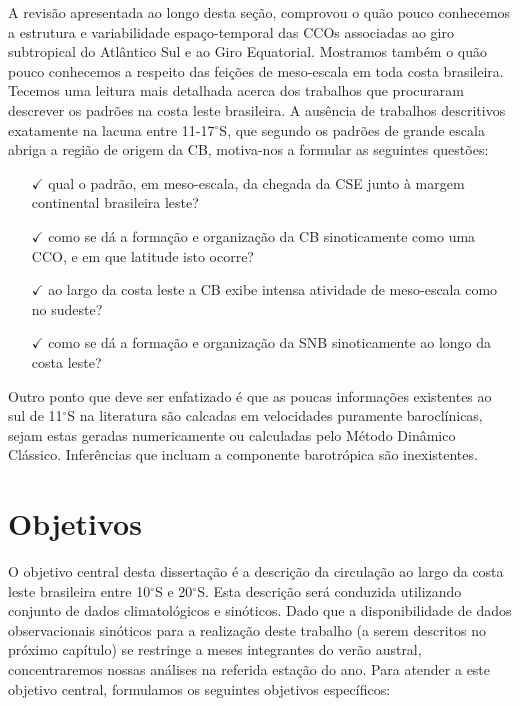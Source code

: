 A revisão apresentada ao longo desta seção, comprovou o quão pouco conhecemos a estrutura
e variabilidade espaço-temporal das CCOs associadas ao 
giro subtropical do Atlântico Sul e ao Giro Equatorial. Mostramos também o quão pouco conhecemos
a respeito das feições de meso-escala em toda costa brasileira. Tecemos uma leitura
mais detalhada acerca dos trabalhos que procuraram descrever os padrões na 
costa leste brasileira. A ausência de trabalhos descritivos exatamente
na lacuna entre 11-17$^\circ$S, que segundo os padrões de grande escala abriga  
a região de origem da CB, motiva-nos a formular as seguintes questões: 

\begin{itemize}

\item[$\checkmark$] qual o padrão, em meso-escala, da chegada da CSE junto à margem continental brasileira leste?

\item[$\checkmark$] como se dá a formação e organização da CB sinoticamente como uma CCO, e em que latitude isto ocorre?

\item[$\checkmark$] ao largo da costa leste a CB exibe intensa atividade de meso-escala como no
sudeste? 

\item[$\checkmark$] como se dá a formação e organização da SNB sinoticamente ao longo da costa leste? 

\end{itemize}

Outro ponto que deve ser enfatizado é que as poucas informações existentes ao sul de 11$^\circ$S na literatura são 
calcadas em velocidades puramente baroclínicas, sejam estas geradas numericamente ou calculadas
pelo Método Dinâmico Clássico. Inferências que incluam a componente barotrópica são inexistentes. 

\section{Objetivos}\label{sec:obj}

\hspace{6mm} O objetivo central desta dissertação é a descrição da circulação ao largo da costa leste brasileira
entre 10$^\circ$S e 20$^\circ$S. Esta descrição será conduzida utilizando conjunto de dados climatológicos e sinóticos.
 Dado que a disponibilidade de dados observacionais sinóticos
 para a realização deste trabalho (a serem descritos no próximo capítulo) se restringe a meses integrantes
do verão austral, concentraremos nossas análises na referida estação do ano. 
Para atender a este objetivo central, formulamos os seguintes objetivos específicos:

